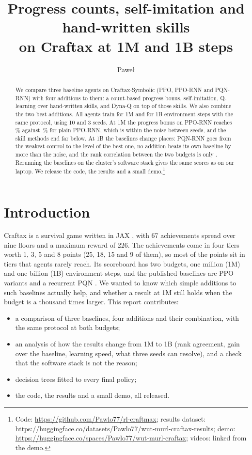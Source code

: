 \documentclass[cameraready]{Interspeech}
\title{Progress counts, self-imitation and hand-written skills\\on Craftax at 1M and 1B steps}
\author[affiliation={1}]{Pawe{\l}}{Pozorski}
\begin{document}
\maketitle

\begin{abstract}
We compare three baseline agents on Craftax-Symbolic (PPO, PPO-RNN and PQN-RNN) with four additions to them: a count-based progress bonus, self-imitation, Q-learning over hand-written skills, and Dyna-Q on top of those skills. We also combine the two best additions. All agents train for 1M and for 1B environment steps with the same protocol, using 10 and 3 seeds. At 1M the progress bonus on PPO-RNN reaches \scoreOneMCountBonusPpoRnn\,\% against \scoreOneMPpoRnn\,\% for plain PPO-RNN, which is within the noise between seeds, and the skill methods end far below. At 1B the baselines change places: PQN-RNN goes from the weakest control to the level of the best one, no addition beats its own baseline by more than the noise, and the rank correlation between the two budgets is only \scaleSpearman. Rerunning the baselines on the cluster's software stack gives the same scores as on our laptop. We release the code, the results and a small demo.\footnote{Code: \url{https://github.com/Pawlo77/rl-craftmax}; results dataset: \url{https://huggingface.co/datasets/Pawlo77/wut-murl-craftax-results}; demo: \url{https://huggingface.co/spaces/Pawlo77/wut-murl-craftax}; videos: linked from the demo.}
\end{abstract}

\section{Introduction}

Craftax \cite{matthews2024craftax} is a survival game written in JAX \cite{bradbury2018jax}, with 67 achievements spread over nine floors and a maximum reward of 226. The achievements come in four tiers worth 1, 3, 5 and 8 points (25, 18, 15 and 9 of them), so most of the points sit in tiers that agents rarely reach. Its scoreboard has two budgets, one million (1M) and one billion (1B) environment steps, and the published baselines are PPO \cite{schulman2017proximal} variants and a recurrent PQN \cite{gallici2025simplifying}. We wanted to know which simple additions to such baselines actually help, and whether a result at 1M still holds when the budget is a thousand times larger. This report contributes:
\begin{itemize}
\item a comparison of three baselines, four additions and their combination, with the same protocol at both budgets;
\item an analysis of how the results change from 1M to 1B (rank agreement, gain over the baseline, learning speed, what three seeds can resolve), and a check that the software stack is not the reason;
\item decision trees fitted to every final policy;
\item the code, the results and a small demo, all released.
\end{itemize}
\end{document}
